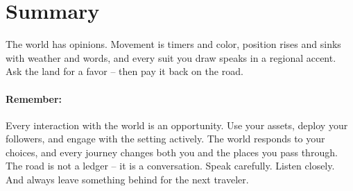 \section{Summary}
\label{sec:world-summary}
The world has opinions. Movement is timers and color, position rises and sinks with weather and words, and every suit you draw speaks in a regional accent. Ask the land for a favor -- then pay it back on the road.

\paragraph{Remember:} Every interaction with the world is an opportunity. Use your assets, deploy your followers, and engage with the setting actively. The world responds to your choices, and every journey changes both you and the places you pass through. The road is not a ledger -- it is a conversation. Speak carefully. Listen closely. And always leave something behind for the next traveler.
